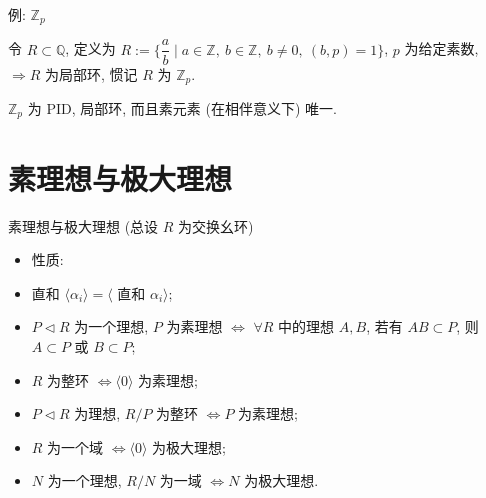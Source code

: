 
\begin{frame}{例: $\mathbb{Z}_p$}

\begin{eg}[$\mathbb{Z}_p$]
令 $R \subset \mathbb{Q}$, 定义为
$R := \Big\{ \dfrac{a}{b} \;\Big|\; a \in \mathbb{Z},\ b \in \mathbb{Z},\
b \neq 0,\ (b, p) = 1 \Big\}$, $p$ 为给定素数,
$\Longrightarrow R$ 为局部环, 惯记 $R$ 为 $\mathbb{Z}_p$.
\end{eg}

\begin{lem}[$\mathbb{Z}_p$]
$\mathbb{Z}_p$ 为 PID, 局部环, 而且素元素 (在相伴意义下) 唯一.
\end{lem}

\end{frame}


\section[素与极大]{素理想与极大理想}


\begin{frame}{素理想与极大理想 (总设 $R$ 为交换幺环)}

\begin{itemize}
\item 性质:
\item[(i)] 直和 $\langle \alpha_i \rangle = \langle$ 直和 $\alpha_i \rangle$;
\item[(ii)] $P \lhd R$ 为一个理想, $P$ 为素理想
  $\iff$ $\forall R$ 中的理想 $A, B$, 若有 $AB \subset P$,
  则 $A \subset P$ 或 $B \subset P$;
\item[(iii)] $R$ 为整环 $\iff \langle 0 \rangle$ 为素理想;
\item[] \hspace{3em} $P \lhd R$ 为理想, $R/P$ 为整环 $\iff P$ 为素理想;
\item[(iv)] $R$ 为一个域 $\iff \langle 0 \rangle$ 为极大理想;
\item[] \hspace{3em} $N$ 为一个理想, $R/N$ 为一域 $\iff N$ 为极大理想.
\end{itemize}

\end{frame}


